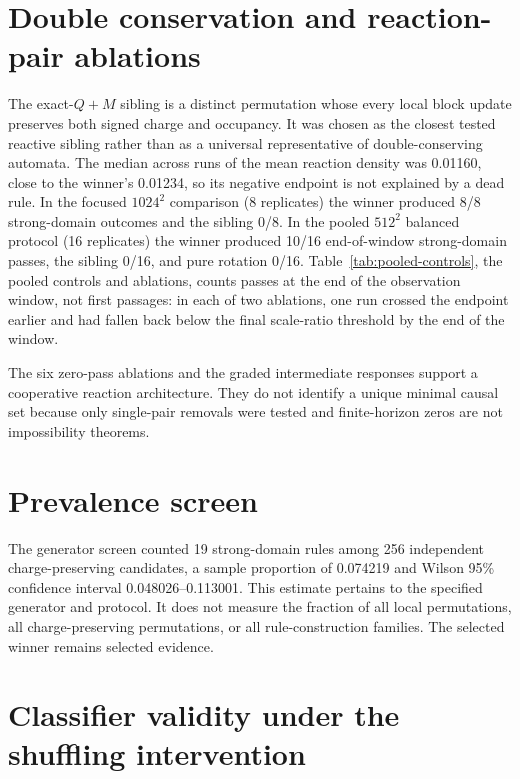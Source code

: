 \documentclass[11pt,a4paper]{article}
\begin{document}
\section{Double conservation and reaction-pair ablations}
The exact-$Q{+}M$ sibling is a distinct permutation whose every local block update preserves both signed charge and occupancy. It was chosen as the closest tested reactive sibling rather than as a universal representative of double-conserving automata. The median across runs of the mean reaction density was 0.01160, close to the winner's 0.01234, so its negative endpoint is not explained by a dead rule. In the focused $1024^2$ comparison (8 replicates) the winner produced 8/8 strong-domain outcomes and the sibling 0/8. In the pooled $512^2$ balanced protocol (16 replicates) the winner produced 10/16 end-of-window strong-domain passes, the sibling 0/16, and pure rotation 0/16. Table~\ref{tab:pooled-controls}, the pooled controls and ablations, counts passes at the end of the observation window, not first passages: in each of two ablations, one run crossed the endpoint earlier and had fallen back below the final scale-ratio threshold by the end of the window.

\begin{table}[h]
\centering
\caption{Pooled matched controls and ablations: end-of-window strong-domain passes ($512^2$, 16 replicates each).}\label{tab:pooled-controls}
\resizebox{\linewidth}{!}{}
\end{table}

The six zero-pass ablations and the graded intermediate responses support a cooperative reaction architecture. They do not identify a unique minimal causal set because only single-pair removals were tested and finite-horizon zeros are not impossibility theorems.

\section{Prevalence screen}
The generator screen counted 19 strong-domain rules among 256 independent charge-preserving candidates, a sample proportion of 0.074219 and Wilson 95\% confidence interval 0.048026--0.113001. This estimate pertains to the specified generator and protocol. It does not measure the fraction of all local permutations, all charge-preserving permutations, or all rule-construction families. The selected winner remains selected evidence.

\section{Classifier validity under the shuffling intervention}
\end{document}
